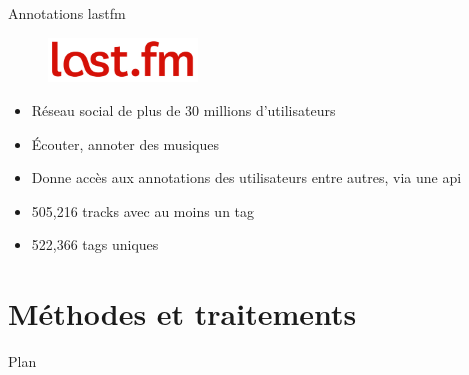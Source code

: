 \documentclass{beamer}
\begin{document}
\begin{frame}{Annotations lastfm} %
\begin{figure}
\centering
\includegraphics[width=150px]{images/lastfm.jpg}
\end{figure}
\begin{itemize}
    \item Réseau social de plus de 30 millions d'utilisateurs
    \item Écouter, annoter des musiques
    \item Donne accès aux annotations des utilisateurs entre autres,
        via une api
    \item 505,216 tracks avec au moins un tag
    \item 522,366 tags uniques
\end{itemize}
\end{frame} %

\section{Méthodes et traitements}

\begin{frame}{Plan}
    \tableofcontents[currentsection]
\end{frame}
\end{document}
